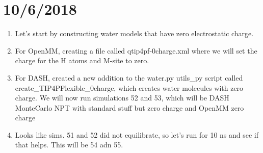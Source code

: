 \documentclass[12pt,reqno]{amsart}
\numberwithin{equation}{section}
\begin{document}
\section{10/6/2018}
\begin{enumerate}
\item Let's start by constructing water models that have zero electrostatic charge.  
\item For OpenMM, creating a file called qtip4pf-0charge.xml where we will set the charge for the H atoms and M-site to zero.  
\item For DASH, created a new addition to the water.py utils\_py script called create\_TIP4PFlexible\_0charge, which creates water molecules with zero charge.  We will now run simulations 52 and 53, which will be DASH MonteCarlo NPT with standard stuff but zero charge and OpenMM zero charge
\item Looks like sims. 51 and 52 did not equilibrate, so let's run for 10 ns and see if that helps.  This will be 54 adn 55.  
\end{enumerate}
\end{document}
